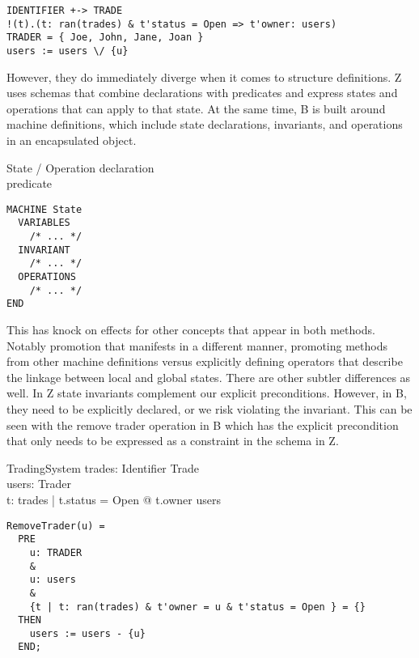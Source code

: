 \documentclass{article}
\begin{document}
\begin{verbatim}
IDENTIFIER +-> TRADE
!(t).(t: ran(trades) & t'status = Open => t'owner: users)
TRADER = { Joe, John, Jane, Joan }
users := users \/ {u}
\end{verbatim}

\hspace{-0.68cm} However, they do immediately diverge when it comes to structure definitions. Z uses schemas that combine declarations with predicates and express states and operations that can apply to that state. At the same time, B is built around machine definitions, which include state declarations, invariants, and operations in an encapsulated object.

\begin{schema}{State / Operation}
declaration \\
\where 
predicate \\
\end{schema}

\begin{verbatim}
MACHINE State
  VARIABLES
    /* ... */
  INVARIANT
    /* ... */
  OPERATIONS
    /* ... */
END
\end{verbatim}

\hspace{-0.68cm} This has knock on effects for other concepts that appear in both methods. Notably promotion that manifests in a different manner, promoting methods from other machine definitions versus explicitly defining operators that describe the linkage between local and global states. There are other subtler differences as well. In Z state invariants complement our explicit preconditions. However, in B, they need to be explicitly declared, or we risk violating the invariant. This can be seen with the remove trader operation in B which has the explicit precondition that only needs to be expressed as a constraint in the schema in Z.
\begin{schema}{TradingSystem}
trades: Identifier \pfun Trade \\
users: \power Trader \\
\where
\forall t: \ran trades | t.status = Open @ t.owner \in users \\ 
\end{schema}

\begin{verbatim}
RemoveTrader(u) = 
  PRE
    u: TRADER
    &
    u: users
    &
    {t | t: ran(trades) & t'owner = u & t'status = Open } = {}
  THEN
    users := users - {u}
  END;
\end{verbatim}
\end{document}
